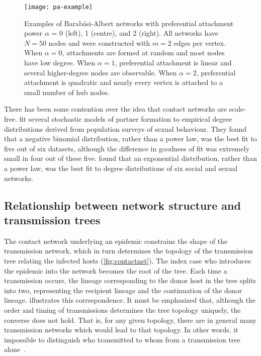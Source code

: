 \begin{figure}
  \texttt{[image: pa-example]}
  \caption[
    Examples of Barab\'asi-Albert networks with preferential attachment power
    $\alpha$ = 0, 1, and 2.
  ]{
    Examples of Barab\'asi-Albert networks with preferential attachment power
    $\alpha$ = 0 (left), 1 (centre), and 2 (right). All networks have $N = 50$
    nodes and were constructed with $m = 2$ edges per vertex. When $\alpha =
    0$, attachments are formed at random and most nodes have low degree. When
    $\alpha = 1$, preferential attachment is linear and several higher-degree
    nodes are observable. When $\alpha = 2$, preferential attachment is
    quadratic and nearly every vertex is attached to a small number of hub
    nodes.
  }
  \label{fig:baeg}
\end{figure}

There has been some contention over the idea that contact networks are
scale-free. \textcite{handcock2004likelihood} fit several stochastic models of
partner formation to empirical degree distributions derived from population
surveys of sexual behaviour. They found that a negative binomial distribution,
rather than a power law, was the best fit to five out of six datasets, although
the difference in goodness of fit was extremely small in four out of these
five. \textcite{bansal2007individual} found that an exponential distribution,
rather than a power law, was the best fit to degree distributions of six social
and sexual networks. 

\subsection{Relationship between network structure and transmission trees}

The contact network underlying an epidemic constrains the shape of the
transmission network, which in turn determines the topology of the transmission
tree relating the infected hosts (\cref{fig:contactnet}). The index case who
introduces the epidemic into the network becomes the root of the tree. Each
time a transmission occurs, the lineage corresponding to the donor host in the
tree splits into two, representing the recipient lineage and the continuation
of the donor lineage.  illustrates this correspondence.
It must be emphasized that, although the order and timing of transmissions
determines the tree topology uniquely, the converse does not hold. That is, for
any given topology, there are in general many transmission networks which would
lead to that topology. In other words, it impossible to distinguish who
transmitted to whom from a transmission tree alone~\autocite{bernard2007hiv}.

